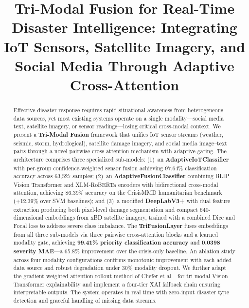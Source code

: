 \documentclass[journal]{IEEEtran}
\begin{document}
\title{Tri-Modal Fusion for Real-Time Disaster Intelligence: Integrating IoT Sensors, Satellite Imagery, and Social Media Through Adaptive Cross-Attention}

\author{
}

\maketitle

\begin{abstract}
Effective disaster response requires rapid situational awareness from heterogeneous data sources, yet most existing systems operate on a single modality---social media text, satellite imagery, or sensor readings---losing critical cross-modal context. We present a \textbf{Tri-Modal Fusion} framework that unifies IoT sensor streams (weather, seismic, storm, hydrological), satellite damage imagery, and social media image--text pairs through a novel pairwise cross-attention mechanism with adaptive gating. The architecture comprises three specialized sub-models: (1)~an \textbf{AdaptiveIoTClassifier} with per-group confidence-weighted sensor fusion achieving 97.64\% classification accuracy across 63,527 samples; (2)~an \textbf{AdaptiveFusionClassifier} combining BLIP Vision Transformer and XLM-RoBERTa encoders with bidirectional cross-modal attention, achieving 86.39\% accuracy on the CrisisMMD humanitarian benchmark (+12.39\% over SVM baselines); and (3)~a modified \textbf{DeepLabV3+} with dual feature extraction producing both pixel-level damage segmentation and compact 640-dimensional embeddings from xBD satellite imagery, trained with a combined Dice and Focal loss to address severe class imbalance. The \textbf{TriFusionLayer} fuses embeddings from all three sub-models via three pairwise cross-attention blocks and a learned modality gate, achieving \textbf{99.41\% priority classification accuracy} and \textbf{0.0398 severity MAE}---a 65.8\% improvement over the crisis-only baseline. An ablation study across four modality configurations confirms monotonic improvement with each added data source and robust degradation under 30\% modality dropout. We further adapt the gradient-weighted attention rollout method of Chefer et al.~\cite{chefer2021transformer} for tri-modal Vision Transformer explainability and implement a four-tier XAI fallback chain ensuring interpretable outputs. The system operates in real time with zero-input disaster type detection and graceful handling of missing data streams.
\end{abstract}
\end{document}
